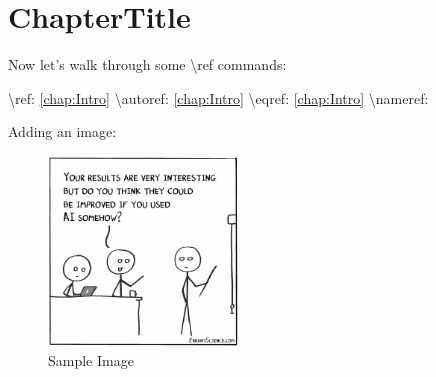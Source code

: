 
\chapter[ChapterShortTitle]{ChapterTitle}

Now let's walk through some \textbackslash ref commands:

\begin{exe}
    \ex \textbackslash ref: \ref{chap:Intro}
    \ex \textbackslash autoref: \autoref{chap:Intro}
    \ex \textbackslash eqref: \eqref{chap:Intro}
    \ex \textbackslash nameref: 
    
\end{exe}


Adding an image:
\begin{figure}[ht]
    \centering
    \includegraphics[width=0.45\textwidth]{images/ai-results-improve.jpeg}
    \caption{Sample Image}
    \label{fig:ai-image}
\end{figure}

